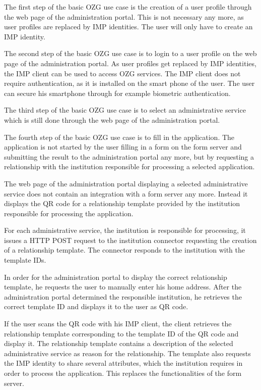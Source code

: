 
The first step of the basic OZG use case is the creation of a user profile through the web page of the administration portal. This is not necessary any more, as user profiles are replaced by IMP identities. The user will only have to create an IMP identity.

The second step of the basic OZG use case is to login to a user profile on the web page of the administration portal. As user profiles get replaced by IMP identities, the IMP client can be used to access OZG services. The IMP client does not require authentication, as it is installed on the smart phone of the user. The user can secure his smartphone through for example biometric authentication.

The third step of the basic OZG use case is to select an administrative service which is still done through the web page of the administration portal.

The fourth step of the basic OZG use case is to fill in the application. The application is not started by the user filling in a form on the form server and submitting the result to the administration portal any more, but by requesting a relationship with the institution responsible for processing a selected application.

The web page of the administration portal displaying a selected administrative service does not contain an integration with a form server any more. Instead it displays the QR code for a relationship template provided by the institution responsible for processing the application.

For each administrative service, the institution is responsible for processing, it issues a HTTP POST request to the institution connector requesting the creation of a relationship template. The connector responds to the institution with the template IDs.

In order for the administration portal to display the correct relationship template, he requests the user to manually enter his home address. After the administration portal determined the responsible institution, he retrieves the correct template ID and displays it to the user as QR code.

If the user scans the QR code with his IMP client, the client retrieves the relationship template corresponding to the template ID of the QR code and display it. The relationship template contains a description of the selected administrative service as reason for the relationship. The template also requests the IMP identity to share several attributes, which the institution requires in order to process the application. This replaces the functionalities of the form server.

